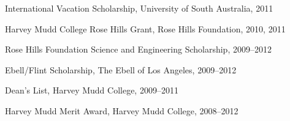 \documentclass[11pt]{article}
\begin{document}
\noindent International Vacation Scholarship,
University of South Australia, 2011
\vspace{2mm}

\noindent Harvey Mudd College Rose Hills Grant,
Rose Hills Foundation, 2010, 2011
\vspace{2mm}

\noindent Rose Hills Foundation Science and Engineering Scholarship,
2009--2012
\vspace{2mm}

\noindent Ebell/Flint Scholarship,
The Ebell of Los Angeles, 2009--2012
\vspace{2mm}

\noindent Dean's List,
Harvey Mudd College, 2009--2011
\vspace{2mm}

\noindent Harvey Mudd Merit Award,
Harvey Mudd College, 2008--2012
\vspace{2mm}
\end{document}
